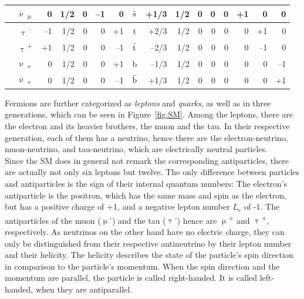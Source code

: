 \begin{table}
\begin{tabularx}{\textwidth}{c|c|rrrrr|@{\hskip 0.03in}|c|rrrrrrrr}
\rowcolor{Gray}
\multirow{-4}{*}{\rotatebox[origin=c]{90}{\parbox[c]{1.9cm}{\centering Second generation}}}& $\bar\upnu$\textsubscript{$\upmu$} & 0 & 1/2 & 0 & --1 & 0  & $\bar{\rm{s}}$ & +1/3 & 1/2 & 0 & 0 & 0 & +1 & 0 & 0\\
\hline
& $\uptau$\textsuperscript{--} & --1 & 1/2 & 0 & 0 & +1 & t & +2/3 & 1/2 & 0 & 0 & 0 & 0 & +1 & 0\\
\rowcolor{Gray}
\cellcolor{white}& $\uptau$\textsuperscript{+} & +1 & 1/2 & 0 & 0 & --1 & $\bar{\rm{t}}$ & --2/3 & 1/2 & 0 & 0 & 0 & 0 & --1 & 0\\
& $\upnu$\textsubscript{$\uptau$} & 0 & 1/2 & 0 & 0 & +1 & b & --1/3 & 1/2 & 0 & 0 & 0 & 0 & 0 & --1\\
\rowcolor{Gray}
\multirow{-4}{*}{\rotatebox[origin=c]{90}{\parbox[c]{1.9cm}{\centering Third generation}}}& $\bar\upnu$\textsubscript{$\uptau$} & 0 & 1/2 & 0 & 0 & --1 & $\bar{\rm{b}}$ & +1/3 & 1/2 & 0 & 0 & 0 & 0 & 0 & +1\\
\hline\hline
\end{tabularx}
\end{table}
Fermions are further categorized as \textit{leptons} and \textit{quarks}, as well as in three generations, which can be seen in Figure~\ref{fig:SM}.
Among the leptons, there are the electron and its heavier brothers, the muon and the tau.
In their respective generation, each of them has a neutrino, hence there are the electron-neutrino, muon-neutrino, and tau-neutrino, which are electrically neutral particles.\\
Since the SM does in general not remark the corresponding antiparticles, there are actually not only six leptons but twelve.
The only difference between particles and antiparticles is the sign of their internal quantum numbers:
The electron's antiparticle is the positron, which has the same mass and spin as the electron, but has a positive charge of +1, and a negative lepton number $L_e$ of -1.
The antiparticles of the muon ($\upmu$\textsuperscript{-}) and the tau ($\uptau$\textsuperscript{-}) hence are $\upmu$\textsuperscript{+} and $\uptau$\textsuperscript{+}, respectively.
As neutrinos on the other hand have no electric charge, they can only be distinguished from their respective antineutrino by their lepton number and their helicity.
The helicity describes the state of the particle's spin direction in comparison to the particle's momentum.
When the spin direction and the momentum are parallel, the particle is called right-handed.
It is called left-handed, when they are antiparallel.

